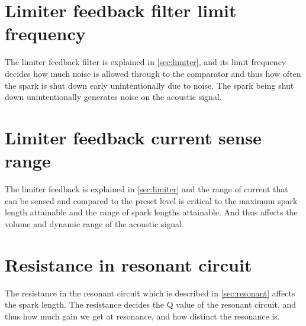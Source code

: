 \section{Limiter feedback filter limit frequency}
The limiter feedback filter is explained in \cref{sec:limiter}, and its limit frequency decides how much noise is allowed through to the comparator and thus how often the spark is shut down early unintentionally due to noise. The spark being shut down unintentionally generates noise on the acoustic signal.

\section{Limiter feedback current sense range}
The limiter feedback is explained in \cref{sec:limiter} and the range of current that can be sensed and compared to the preset level is critical to the maximum spark length attainable and the range of spark lengths attainable. And thus affects the volume and dynamic range of the acoustic signal.

\section{Resistance in resonant circuit}
The resistance in the resonant circuit which is described in \cref{sec:resonant} affects the spark length. The resistance decides the Q value of the resonant circuit, and thus how much gain we get at resonance, and how distinct the resonance is.

\section{}